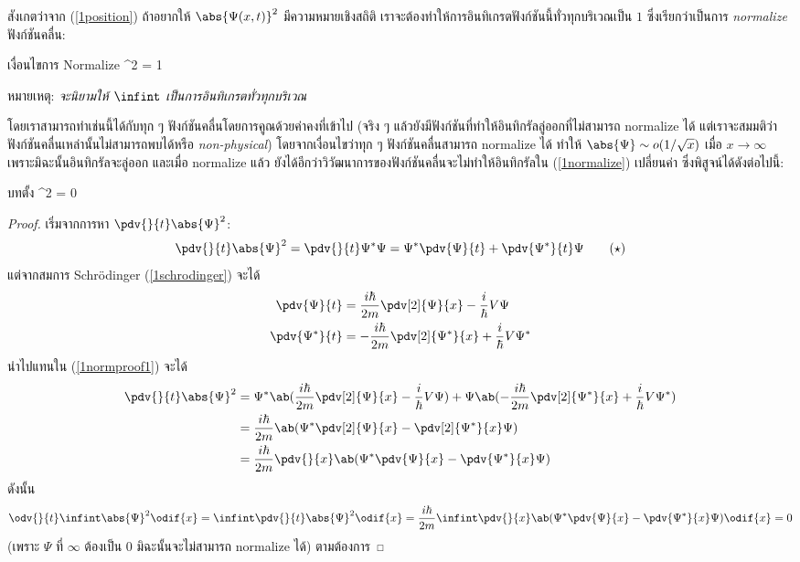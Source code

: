 สังเกตว่าจาก (\ref{1position}) ถ้าอยากให้ $\abs{\Psi(x, t)}^2$ มีความหมายเชิงสถิติ เราจะต้องทำให้การอินทิเกรตฟังก์ชันนี้ทั่วทุกบริเวณเป็น $1$ ซึ่งเรียกว่าเป็นการ \emph{normalize} ฟังก์ชันคลื่น:
\begin{eqbox}{เงื่อนไขการ Normalize}
    \infint{}^2  = 1 \label{1normalize}
\end{eqbox}
หมายเหตุ: \emph{จะนิยามให้ $\infint$ เป็นการอินทิเกรตทั่วทุกบริเวณ}

โดยเราสามารถทำเช่นนี้ได้กับทุก ๆ ฟังก์ชันคลื่นโดยการคูณด้วยค่าคงที่เข้าไป (จริง ๆ แล้วยังมีฟังก์ชันที่ทำให้อินทิกรัลลู่ออกที่ไม่สามารถ normalize ได้ แต่เราจะสมมติว่าฟังก์ชันคลื่นเหล่านั้นไม่สามารถพบได้หรือ \emph{non-physical}) โดยจากเงื่อนไขว่าทุก ๆ ฟังก์ชันคลื่นสามารถ normalize ได้ ทำให้ $\abs{\Psi} \sim o(1/\sqrt{x})$ เมื่อ $x \to \infty$ เพราะมิฉะนั้นอินทิกรัลจะลู่ออก และเมื่อ normalize แล้ว ยังได้อีกว่าวิวัฒนาการของฟังก์ชันคลื่นจะไม่ทำให้อินทิกรัลใน (\ref{1normalize}) เปลี่ยนค่า ซึ่งพิสูจน์ได้ดังต่อไปนี้:
\begin{eqbox}{บทตั้ง}
     \infint {}^2  = 0
\end{eqbox}
\begin{proof}
    เริ่มจากการหา $\pdv{}{t}\abs{\Psi}^2$:
    \begin{equation}
        \pdv{}{t}\abs{\Psi}^2 = \pdv{}{t}\Psi^*\Psi = \Psi^*\pdv{\Psi}{t} + \pdv{\Psi^*}{t}\Psi \tag{$\star$}\label{1normproof1}
    \end{equation} 
    แต่จากสมการ Schrödinger (\ref{1schrodinger}) จะได้
    \begin{align*}
        \pdv{\Psi}{t} &= \frac{i\hbar}{2m}\pdv[2]{\Psi}{x} - \frac{i}{\hbar}V\Psi\\
        \pdv{\Psi^*}{t} &= -\frac{i\hbar}{2m}\pdv[2]{\Psi^*}{x} + \frac{i}{\hbar}V\Psi^*
    \end{align*}
    นำไปแทนใน (\ref{1normproof1}) จะได้
    \begin{align}
        \pdv{}{t}\abs{\Psi}^2 &= \Psi^*\ab(\frac{i\hbar}{2m}\pdv[2]{\Psi}{x} - \frac{i}{\hbar}V\Psi) + \Psi\ab(-\frac{i\hbar}{2m}\pdv[2]{\Psi^*}{x} + \frac{i}{\hbar}V\Psi^*) \notag\\
        &= \frac{i\hbar}{2m}\ab(\Psi^*\pdv[2]{\Psi}{x} - \pdv[2]{\Psi^*}{x}\Psi)\notag\\
        &= \frac{i\hbar}{2m}\pdv{}{x}\ab(\Psi^*\pdv{\Psi}{x} - \pdv{\Psi^*}{x}\Psi)\label{1normproof2}
    \end{align}
    ดังนั้น
    \[
    \odv{}{t}\infint\abs{\Psi}^2\odif{x} = \infint\pdv{}{t}\abs{\Psi}^2\odif{x} = \frac{i\hbar}{2m}\infint \pdv{}{x}\ab(\Psi^*\pdv{\Psi}{x} - \pdv{\Psi^*}{x}\Psi)\odif{x} = 0
    \]
    (เพราะ $\Psi$ ที่ $\infty$ ต้องเป็น $0$ มิฉะนั้นจะไม่สามารถ normalize ได้) ตามต้องการ
\end{proof}

